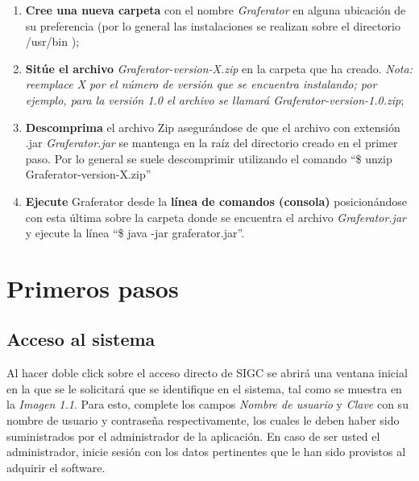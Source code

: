 \documentclass{book}
\begin{document}
\begin{enumerate}
	\itemsep=8pt \topsep=0pt \partopsep=0pt \parskip=0pt \parsep=0pt
	
	\item \textbf{Cree una nueva carpeta} con el nombre \textit{Graferator} en alguna ubicación de su preferencia (por lo general las instalaciones se realizan sobre el directorio /usr/bin );

	\item \textbf{Sitúe el archivo} \textit{Graferator-version-X.zip} en la carpeta que ha creado. \textit{Nota: reemplace X por el número de versión que se encuentra instalando; por ejemplo, para la versión 1.0 el archivo se llamará Graferator-version-1.0.zip};

	\item \textbf{Descomprima} el archivo Zip asegurándose de que el archivo con extensión .jar \textit{Graferator.jar} se mantenga en la raíz del directorio creado en el primer paso. Por lo general se suele descomprimir utilizando el comando ``{\ttfamily\footnotesize \$ unzip Graferator-version-X.zip}''

	\item \textbf{Ejecute} Graferator desde la \textbf{línea de comandos (consola)} posicionándose con esta última sobre la carpeta donde se encuentra el archivo \textit{Graferator.jar} y ejecute la línea ``{\ttfamily\footnotesize \$ java -jar graferator.jar}''.

\end{enumerate}
\bigskip




%
%
\chapter{Primeros pasos}


\section{Acceso al sistema}

Al hacer doble click sobre el acceso directo de SIGC se abrirá una ventana inicial en la que se le solicitará que se identifique en el sistema, tal como se muestra en la \textit{Imagen 1.1}. Para esto, complete los campos \textit{Nombre de usuario} y \textit{Clave} con su nombre de usuario y contraseña respectivamente, los cuales le deben haber sido suministrados por el administrador de la aplicación. En caso de ser usted el administrador, inicie sesión con los datos pertinentes que le han sido provistos al adquirir el software.
\bigskip
\end{document}
